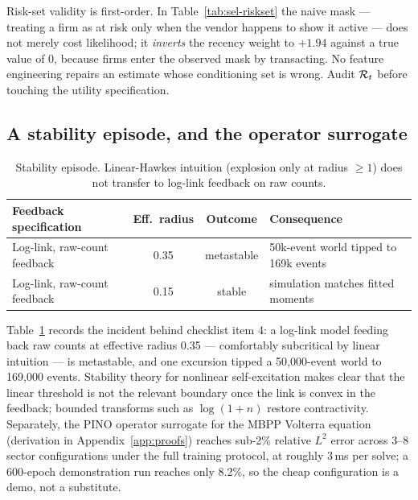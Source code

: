 \begin{warning}
\label{warn:sel-riskset}
Risk-set validity is first-order. In Table~\ref{tab:sel-riskset} the naive mask --- treating a firm as at
risk only when the vendor happens to show it active --- does not merely cost likelihood; it \emph{inverts}
the recency weight to $+1.94$ against a true value of 0, because firms enter the observed mask by
transacting. No feature engineering repairs an estimate whose conditioning set is wrong. Audit $\mathcal{R}_t$
before touching the utility specification.
\end{warning}

\subsection{A stability episode, and the operator surrogate}
\label{sec:sel-stability}

\begin{table}[htbp]
\centering
\small
\begin{tabular}{lccl}
\toprule
Feedback specification & Eff.\ radius & Outcome & Consequence \\
\midrule
Log-link, raw-count feedback & 0.35 & metastable & 50k-event world tipped to 169k events \\
Log-link, raw-count feedback & 0.15 & stable & simulation matches fitted moments \\
\bottomrule
\end{tabular}
\caption{Stability episode. Linear-Hawkes intuition (explosion only at radius $\ge 1$) does not transfer
to log-link feedback on raw counts.}
\label{tab:sel-stability}
\end{table}

Table~\ref{tab:sel-stability} records the incident behind checklist item 4: a log-link model feeding back
raw counts at effective radius 0.35 --- comfortably subcritical by linear intuition --- is metastable, and one
excursion tipped a 50{,}000-event world to 169{,}000 events. Stability theory for nonlinear self-excitation
\cite{bremaud1996,fokianos2009} makes clear that the linear threshold is not the relevant boundary once the
link is convex in the feedback; bounded transforms such as $\log(1+n)$ restore contractivity. Separately,
the PINO operator surrogate for the MBPP Volterra equation (derivation in Appendix~\ref{app:proofs}) reaches
sub-2\% relative $L^2$ error across 3--8 sector configurations under the full training protocol, at roughly
3\,ms per solve; a 600-epoch demonstration run reaches only 8.2\%, so the cheap configuration is a demo, not
a substitute.

